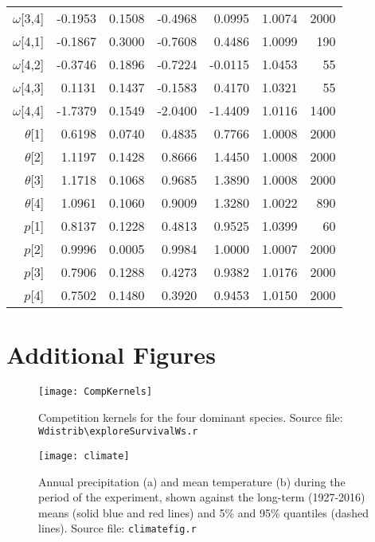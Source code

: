 \documentclass[11pt]{article}
\begin{document}
\begin{table}[ht]
\begin{tabular}{rrrrrrr}
  $\omega$[3,4] & -0.1953 & 0.1508 & -0.4968 & 0.0995 & 1.0074 &  2000 \\ 
  $\omega$[4,1] & -0.1867 & 0.3000 & -0.7608 & 0.4486 & 1.0099 &   190 \\ 
  $\omega$[4,2] & -0.3746 & 0.1896 & -0.7224 & -0.0115 & 1.0453 &    55 \\ 
  $\omega$[4,3] & 0.1131 & 0.1437 & -0.1583 & 0.4170 & 1.0321 &    55 \\ 
  $\omega$[4,4] & -1.7379 & 0.1549 & -2.0400 & -1.4409 & 1.0116 &  1400 \\ 
   $\theta$[1] & 0.6198 & 0.0740 & 0.4835 & 0.7766 & 1.0008 &  2000 \\ 
   $\theta$[2] & 1.1197 & 0.1428 & 0.8666 & 1.4450 & 1.0008 &  2000 \\ 
   $\theta$[3] & 1.1718 & 0.1068 & 0.9685 & 1.3890 & 1.0008 &  2000 \\ 
  $\theta$[4] & 1.0961 & 0.1060 & 0.9009 & 1.3280 & 1.0022 &   890 \\ 
  $p$[1] & 0.8137 & 0.1228 & 0.4813 & 0.9525 & 1.0399 &    60 \\ 
  $p$[2] & 0.9996 & 0.0005 & 0.9984 & 1.0000 & 1.0007 &  2000 \\ 
  $p$[3] & 0.7906 & 0.1288 & 0.4273 & 0.9382 & 1.0176 &  2000 \\ 
  $p$[4] & 0.7502 & 0.1480 & 0.3920 & 0.9453 & 1.0150 &  2000 \\ 
   \hline
\end{tabular}
\end{table}


\clearpage

\section{Additional Figures} 


 \begin{figure}[h]
 \centering
 \texttt{[image: CompKernels]}
 \caption{Competition kernels for the four dominant species. Source file: \texttt{Wdistrib\textbackslash exploreSurvivalWs.r} }
 \label{fig:CompKernels}
 \end{figure}
 
  \begin{figure}[h]
  \centering
  \texttt{[image: climate]}
  \caption{Annual precipitation (a) and mean temperature (b) during the period of the experiment, shown against the long-term (1927-2016) means (solid blue and red lines) and 5\% and 95\% quantiles (dashed lines). Source file:  \texttt{climate\textunderscore fig.r}}
  \label{fig:climate}
  \end{figure}
  
\end{document}
